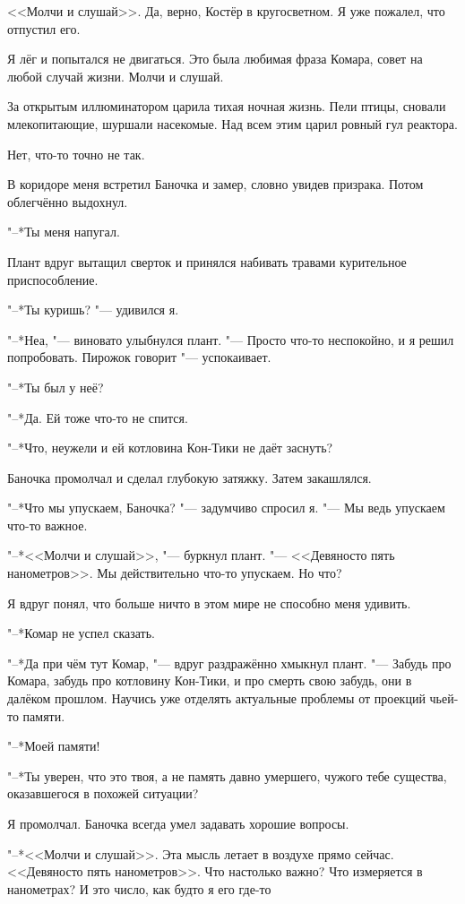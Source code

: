 \documentclass[a4paper,10pt]{book}
\newcommand{\ldotst}{\so{...}\xspace}
\begin{document}
<<Молчи и слушай>>. Да, верно, Костёр в кругосветном. Я уже пожалел, что
отпустил его.

Я лёг и попытался не двигаться. Это была любимая фраза Комара, совет на любой 
случай жизни. Молчи и слушай.

За открытым иллюминатором царила тихая ночная жизнь. Пели птицы, сновали 
млекопитающие, шуршали насекомые. Над всем этим царил ровный гул реактора.

Нет, что-то точно не так.

В коридоре меня встретил Баночка и замер, словно увидев призрака. Потом 
облегчённо выдохнул.

"--*Ты меня напугал.

Плант вдруг вытащил сверток и принялся набивать травами курительное 
приспособление.

"--*Ты куришь? "--- удивился я.

"--*Неа, "--- виновато улыбнулся плант. "--- Просто что-то неспокойно, и я 
решил 
попробовать. Пирожок говорит "--- успокаивает.

"--*Ты был у неё?

"--*Да. Ей тоже что-то не спится.

"--*Что, неужели и ей котловина Кон-Тики не даёт заснуть?

Баночка промолчал и сделал глубокую затяжку. Затем закашлялся.

"--*Что мы упускаем, Баночка? "--- задумчиво спросил я. "--- Мы ведь упускаем 
что-то важное.

"--*<<Молчи и слушай>>, "--- буркнул плант. "--- <<Девяносто пять нанометров>>. 
Мы действительно что-то упускаем. Но что?

Я вдруг понял, что больше ничто в этом мире не способно меня удивить.

"--*Комар не успел сказать.

"--*Да при чём тут Комар, "--- вдруг раздражённо хмыкнул плант. "--- Забудь про 
Комара,
забудь про котловину Кон-Тики, и про смерть свою забудь, они в далёком прошлом. 
Научись уже отделять
актуальные проблемы от проекций чьей-то памяти.

"--*Моей памяти!

"--*Ты уверен, что это твоя, а не память давно умершего, чужого тебе существа, оказавшегося в похожей ситуации?

Я промолчал. Баночка всегда умел задавать хорошие вопросы.

"--*<<Молчи и слушай>>. Эта мысль летает в воздухе прямо сейчас.
<<Девяносто пять нанометров>>. Что настолько важно? Что измеряется в 
нанометрах? И это число, как будто я его где-то\ldotst
\end{document}
